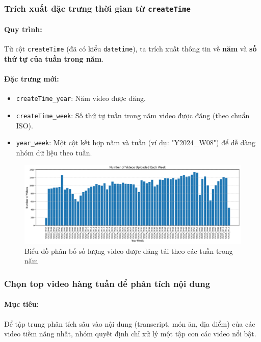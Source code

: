 \subsubsection{Trích xuất đặc trưng thời gian từ \texttt{createTime}}

\paragraph{Quy trình:}
Từ cột \texttt{createTime} (đã có kiểu \texttt{datetime}), ta trích xuất thông tin về \textbf{năm} và \textbf{số thứ tự của tuần trong năm}.

\paragraph{Đặc trưng mới:}
\begin{itemize}
    \item \texttt{createTime\_year}: Năm video được đăng.
    
    \item \texttt{createTime\_week}: Số thứ tự tuần trong năm video được đăng (theo chuẩn ISO).
    
    \item \texttt{year\_week}: Một cột kết hợp năm và tuần (ví dụ: "Y2024\_W08") để dễ dàng nhóm dữ liệu theo tuần.
\end{itemize}

\begin{figure}[H]
    \centering
    \includegraphics[width=1\linewidth]{img/21127739/num_video_per_week.png}
    \caption{Biểu đồ phân bố số lượng video được đăng tải theo các tuần trong năm}
    \label{fig:num_video_per_week}
\end{figure}

\subsubsection{Chọn top video hàng tuần để phân tích nội dung}

\paragraph{Mục tiêu:} 
Để tập trung phân tích sâu vào nội dung (transcript, món ăn, địa điểm) của các video tiềm năng nhất, nhóm quyết định chỉ xử lý một tập con các video nổi bật.

